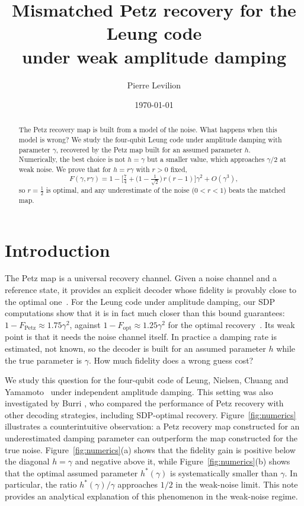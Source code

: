 \documentclass[11pt,a4paper]{article}
\title{Mismatched Petz recovery for the Leung code\\ under weak amplitude damping}
\author{Pierre Levilion}
\date{\today}
\theoremstyle{plain}
\begin{document}
\maketitle

\begin{abstract}
The Petz recovery map is built from a model of the noise. What happens when this model is wrong? We study the four-qubit Leung code under amplitude damping with parameter $\gamma$, recovered by the Petz map built for an assumed parameter $h$. Numerically, the best choice is not $h=\gamma$ but a smaller value, which approaches $\gamma/2$ at weak noise. We prove that for $h=r\gamma$ with $r>0$ fixed,
\[
F(\gamma,r\gamma)=1-\Big[\tfrac74+\Big(1-\tfrac1{\sqrt2}\Big)\,r(r-1)\Big]\gamma^2+O(\gamma^3),
\]
so $r=\frac12$ is optimal, and any underestimate of the noise ($0<r<1$) beats the matched map. 

\end{abstract}

\section{Introduction}

The Petz map is a universal recovery channel. Given a noise channel and a reference state, it provides an explicit decoder whose fidelity is provably close to the optimal one~\cite{barnum2002}. For the Leung code under amplitude damping, our SDP computations show that it is in fact much closer than this bound guarantees: $1-F_{\mathrm{Petz}}\approx1.75\gamma^2$, against $1-F_{\mathrm{opt}}\approx1.25\gamma^2$ for the optimal recovery~\cite{fletcher2007}. Its weak point is that it needs the noise channel itself. In practice a damping rate is estimated, not known, so the decoder is built for an assumed parameter $h$ while the true parameter is $\gamma$. How much fidelity does a wrong guess cost?

We study this question for the four-qubit code of Leung, Nielsen, Chuang and Yamamoto~\cite{leung1997} under independent amplitude damping. This setting was also investigated by Burri \cite{burri2026}, who compared the performance of Petz recovery with other decoding strategies, including SDP-optimal recovery. Figure~\ref{fig:numerics} illustrates a counterintuitive observation: a Petz recovery map constructed for an underestimated damping parameter can outperform the map constructed for the true noise. Figure~\ref{fig:numerics}(a) shows that the fidelity gain is positive below the diagonal $h=\gamma$ and negative above it, while Figure~\ref{fig:numerics}(b) shows that the optimal assumed parameter $h^*(\gamma)$ is systematically smaller than $\gamma$. In particular, the ratio $h^*(\gamma)/\gamma$ approaches $1/2$ in the weak-noise limit. This note provides an analytical explanation of this phenomenon in the weak-noise regime.
\end{document}
